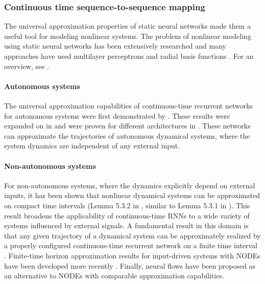 \documentclass{article}
\theoremstyle{definition} \newtheorem{definition}{Definition}
\theoremstyle{remark} \newtheorem{remark}{Remark}
\newcounter{ct}
\begin{document}



\subsubsection{Continuous time sequence-to-sequence mapping}
The universal approximation properties of static neural networks \citep{funahashi1989approximate} made them a useful tool for modeling nonlinear systems. 
The problem of nonlinear modeling using static neural networks has been extensively researched \citep{narendra1990identification,warwick1992neural} and many approaches have used multilayer perceptrons and radial basis functions \citep{chen1992neural,choi1996constructive,tan1995efficient}. 
For an overview, see \citep{garces2012strategies}.


\paragraph{Autonomous systems}
The universal approximation capabilities of continuous-time recurrent networks for autonomous systems were first demonstrated by \citet{funahashi1993approximation}. 
These results were expanded on in \citep{kimura1998learning} and were proven for different architectures in \citep{chow2000modeling}.
These networks can approximate the trajectories of autonomous dynamical systems, where the system dynamics are independent of any external input.


\paragraph{Non-autonomous systems}
For non-autonomous systems, where the dynamics explicitly depend on external inputs, it has been shown that nonlinear dynamical systems can be approximated on compact time intervals (Lemma 5.3.2 in \citep{garces2012strategies}, similar to Lemma 5.3.1 in \citep{smale1974differential}).
This result broadens the applicability of continuous-time RNNs to a wide variety of systems influenced by external signals.
A fundamental result in this domain is that any given trajectory of a dynamical system can be approximately realized by a properly configured continuous-time recurrent network on a finite time interval \citep{nakamura2009approximation}.  %
Finite-time horizon approximation results for input-driven systems with NODEs have been developed more recently \citep{li2022deep, ko2023homotopy, zakwan2023universal}.
Finally, neural flows have been proposed as an alternative to NODEs with comparable approximation capabilities\citep{bilos2021neural}.
\end{document}
